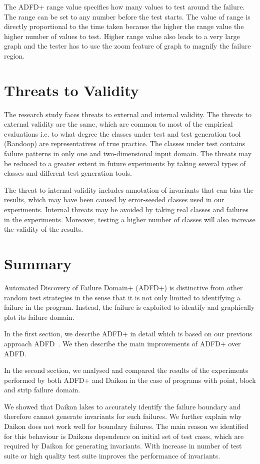 The ADFD+ range value specifies how many values to test around the failure. The range can be set to any number before the test starts. The value of range is directly proportional to the time taken because the higher the range value the higher number of values to test. Higher range value also leads to a very large graph and the tester has to use the zoom feature of graph to magnify the failure region.




\section{Threats to Validity}\label{sec:intro6_14}
The research study faces threats to external and internal validity. The threats to external validity are the same, which are common to most of the empirical evaluations i.e. to what degree the classes under test and test generation tool (Randoop) are representatives of true practice. The classes under test contains failure patterns in only one and two-dimensional input domain. The threats may be reduced to a greater extent in future experiments by taking several types of classes and different test generation tools. 

The threat to internal validity includes annotation of invariants that can bias the results, which may have been caused by error-seeded classes used in our experiments. Internal threats may be avoided by taking real classes and failures in the experiments. Moreover, testing a higher number of classes will also increase the validity of the results.

\section{Summary}
Automated Discovery of Failure Domain+ (ADFD+) is distinctive from other random test strategies in the sense that it is not only limited to identifying a failure in the program. Instead, the failure is exploited to identify and graphically plot its failure domain.

In the first section, we describe ADFD+ in detail which is based on our previous approach ADFD~\cite{ahmad2013adfd}. We then describe the main improvements of ADFD+ over ADFD. 

In the second section, we analysed and compared the results of the experiments performed by both ADFD+ and Daikon in the case of programs with point, block and strip failure domain. 

We showed that Daikon lakes to accurately identify the failure boundary and therefore cannot generate invariants for such failures.  We further explain why Daikon does not work well for boundary failures. The main reason we identified for this behaviour is Daikons dependence on initial set of test cases, which are required by Daikon for generating invariants. With increase in number of test suite or high quality test suite improves the performance of invariants. 

